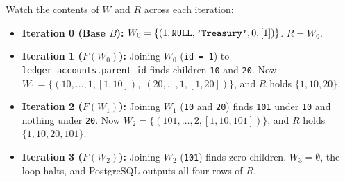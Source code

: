 Watch the contents of $W$ and $R$ across each iteration:
\begin{itemize}
  \item \textbf{Iteration 0 (Base $B$):} $W_0 = \{(1, \text{\texttt{NULL}}, \text{\texttt{'Treasury'}}, 0, [1])\}$. $R = W_0$.
  \item \textbf{Iteration 1 ($F(W_0)$):} Joining $W_0$ (\texttt{id = 1}) to \texttt{ledger\_accounts.parent\_id} finds children \texttt{10} and \texttt{20}. Now $W_1 = \{(10, \dots, 1, [1,10]),\; (20, \dots, 1, [1,20])\}$, and $R$ holds $\{1, 10, 20\}$.
  \item \textbf{Iteration 2 ($F(W_1)$):} Joining $W_1$ (\texttt{10} and \texttt{20}) finds \texttt{101} under \texttt{10} and nothing under \texttt{20}. Now $W_2 = \{(101, \dots, 2, [1,10,101])\}$, and $R$ holds $\{1, 10, 20, 101\}$.
  \item \textbf{Iteration 3 ($F(W_2)$):} Joining $W_2$ (\texttt{101}) finds zero children. $W_3 = \emptyset$, the loop halts, and PostgreSQL outputs all four rows of $R$.
\end{itemize}

